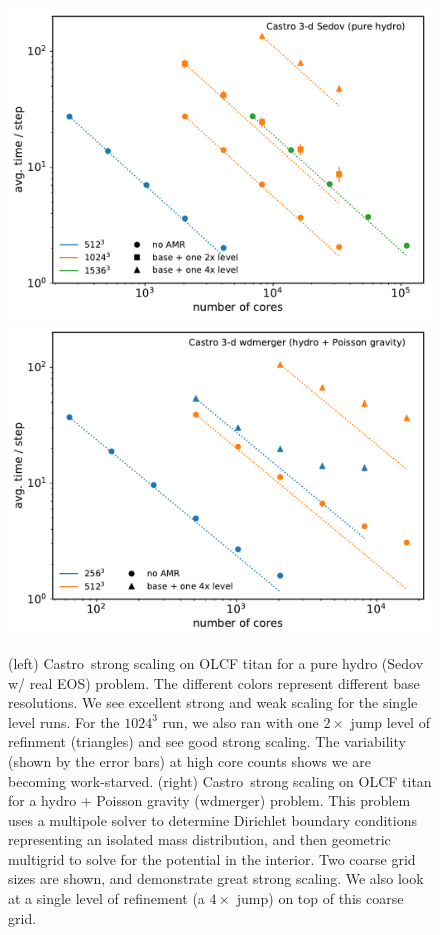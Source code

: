 \documentclass[a4paper]{jpconf}
\newcommand{\castro}{{\sffamily Castro}}
\begin{document}
\begin{figure}[t]
\centering
\includegraphics[width=0.48\linewidth]{sedov_scaling}
\includegraphics[width=0.48\linewidth]{wdmerger_scaling}
\caption{\label{fig:castro-scaling} (left) \castro\ strong scaling on
  OLCF titan for a pure hydro (Sedov w/ real EOS) problem.  The
  different colors represent different base resolutions.  We see
  excellent strong and weak scaling for the single level runs.  For
  the $1024^3$ run, we also ran with one $2\times$ jump level of
  refinment (triangles) and see good strong scaling.  The variability
  (shown by the error bars) at high core counts shows we are becoming
  work-starved. (right) \castro\ strong scaling on OLCF titan for a
  hydro + Poisson gravity (wdmerger) problem.  This problem uses a
  multipole solver to determine Dirichlet boundary conditions
  representing an isolated mass distribution, and then geometric
  multigrid to solve for the potential in the interior.  Two coarse
  grid sizes are shown, and demonstrate great strong scaling.  We also
  look at a single level of refinement (a $4\times$ jump) on top of
  this coarse grid.}
\end{figure}
\end{document}
